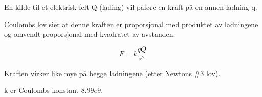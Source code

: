 En kilde til et elektrisk felt Q (lading) vil påføre en kraft
på en annen ladning q.

Coulombs lov sier at denne kraften er
proporsjonal med produktet av ladningene og
omvendt proporsjonal med kvadratet av avstanden.

$$F = k \frac{q Q}{r^2}$$

Kraften virker like mye på begge ladningene (etter Newtons \#3 lov).

k er Coulombs konstant $8.99e9$.
